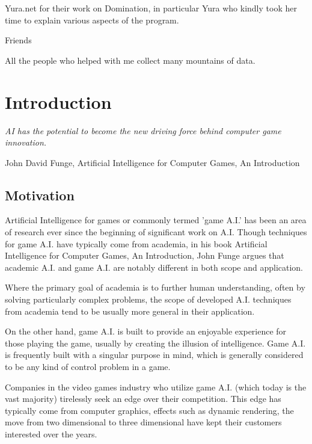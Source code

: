 \documentclass[parskip]{cs4rep}
\begin{document}
Yura.net for their work on Domination, in particular Yura who kindly took her time to explain various aspects of the program.

Friends 

All the people who helped with me collect many mountains of data.

\tableofcontents


\chapter{Introduction}

\begin{flushleft}
\textit{AI has the potential to become the new driving force behind computer game innovation.}
\end{flushleft}
\begin{flushleft}
John David Funge, Artificial Intelligence for Computer Games, An Introduction
\end{flushleft}

\section{Motivation}

Artificial Intelligence for games or commonly termed 'game A.I.' has been an area of research ever since the beginning of significant work on A.I. Though techniques for game A.I. have typically come from academia, in his book Artificial Intelligence for Computer Games, An Introduction, John Funge argues \cite{JohnFunge:AIForComp} that academic A.I. and game A.I. are notably different in both scope and application.

Where the primary goal of academia is to further human understanding, often by solving particularly complex problems, the scope of developed A.I. techniques from academia tend to be usually more general in their application.

On the other hand, game A.I. is built to provide an enjoyable experience for those playing the game, usually by creating the illusion of intelligence. Game A.I. is frequently built with a singular purpose in mind, which is generally considered to be any kind of control problem in a game.

Companies in the video games industry who utilize game A.I. (which today is the vast majority) tirelessly seek an edge over their competition. This edge has typically come from computer graphics, effects such as dynamic rendering, the move from two dimensional to three dimensional have kept their customers interested over the years. 
\end{document}
